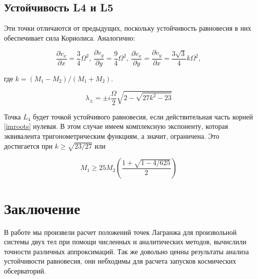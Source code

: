 \documentclass[12pt]{article}
\begin{document}
    \subsection{Устойчивость L4 и L5}
    Эти точки отличаются от предыдущих, поскольку устойчивость равновесия в них
    обеспечивает сила Кориолиса. Аналогично:

    \begin{equation}
        \frac{\partial \dot{v}_x}{\partial x} = \frac{3}{4}\Omega^2,\ 
        \frac{\partial \dot{v}_y}{\partial y} = \frac{9}{4}\Omega^2,\
        \frac{\partial \dot{v}_x}{\partial y} = \frac{\partial \dot{v}_y}{\partial x} = 
        \frac{3\sqrt{3}}{4}k\Omega^2, 
    \end{equation}

    где $k = (M_1 - M_2)/(M_1 + M_2)$.

    \begin{equation}
        \lambda_{\pm} = \pm i\frac{\Omega}{2}\sqrt{2 - \sqrt{27k^2 - 23}}
        \label{imroots}
    \end{equation}

    Точка $L_4$ будет точкой устойчивого равновесия, если действительная часть 
    корней \ref{imroots} нулевая. В этом случае имеем комплексную экспоненту,
    которая эквивалента тригонометрическим функциям, а значит, ограничена. Это
    достигается при $k \geq \sqrt{23/27}$ или 

    \begin{equation}
        M_1 \geq 25M_2\left(\frac{1 + \sqrt{1 - 4/625}}{2}\right)
    \end{equation}

    \section{Заключение}
    В работе мы произвели расчет положений точек Лагранжа для произвольной системы 
    двух тел при помощи численных и аналитических методов, вычислили точности 
    различных аппроксимаций. Так же довольно ценны результаты анализа устойчивости
    равновесия, они небходимы для расчета запусков космических обсерваторий.

    
    
\end{document}
